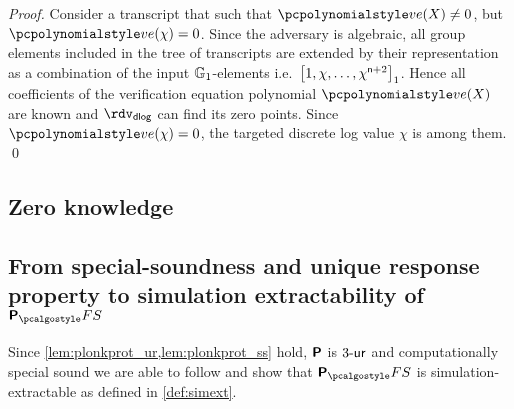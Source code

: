 \let\accentvec\vec \documentclass[runningheads,10pt]{llncs}
\begin{document}
\begin{proof}
	 Consider a transcript that such that
	$\vereq(X) \neq 0$, but $\vereq(\chi) = 0$.
	Since the adversary is algebraic, all group elements included in the tree of
  transcripts are extended by their representation as a combination of the input
  $\mathbb{G}_1$-elements i.e.~$\left[1, \chi, \ldots, \chi^{\mathsf{n} +
      2}\right]_{1}$. Hence all coefficients of the verification equation polynomial
  $\vereq(X)$ are known and $\rdvdlog$ can find its zero points. Since
  $\vereq(\chi) = 0$, the targeted discrete log value $\chi$ is among them.
	\qed
\end{proof}

\subsection{Zero knowledge}

\subsection{From special-soundness and unique response property to simulation extractability of $\plonkprotfs$}

Since \cref{lem:plonkprot_ur,lem:plonkprot_ss} hold, $\bm{\mathsf{P}}$ is ${3\text{-}\mathsf{ur}}$ and computationally special sound we are able to follow \cite{INDOCRYPT:FKMV12} and show that $\plonkprot_\fs$ is simulation-extractable as defined in \cref{def:simext}.
\end{document}
